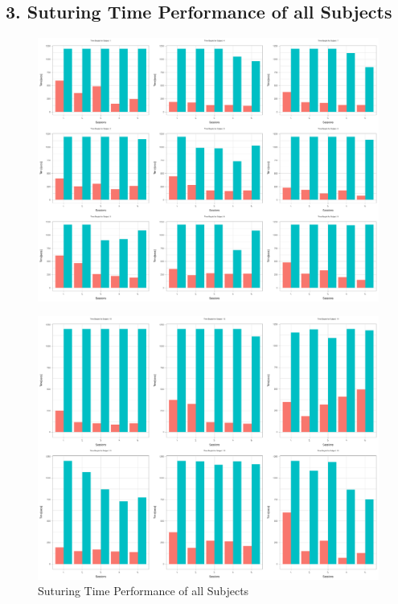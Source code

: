 \documentclass[12pt,epsf]{report}
\begin{document}
{\subsection*{3. Suturing Time Performance of all Subjects}
\begin{figure}[!htb]
	\centering
	\includegraphics[width=1.0\textwidth]{Q5-time-1-labels.pdf}
	\centering
\end{figure}
\begin{figure}[!htb]
	\centering
	\includegraphics[width=1.0\textwidth]{Q5-time-2-labels.pdf}
	\caption{ Suturing Time Performance of all Subjects}
	\centering
\end{figure}
\FloatBarrier
}
\end{document}
